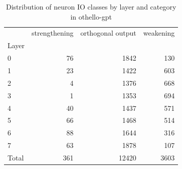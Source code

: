 \begin{table}
\caption{Distribution of neuron IO classes by layer and category in othello-gpt}
\label{tab:othello-gpt}
\begin{tabular}{lrrr}
 & strengthening & orthogonal output & weakening \\
Layer &  &  &  \\
0 & 76 & 1842 & 130 \\
1 & 23 & 1422 & 603 \\
2 & 4 & 1376 & 668 \\
3 & 1 & 1353 & 694 \\
4 & 40 & 1437 & 571 \\
5 & 66 & 1468 & 514 \\
6 & 88 & 1644 & 316 \\
7 & 63 & 1878 & 107 \\
Total & 361 & 12420 & 3603 \\
\end{tabular}
\end{table}
